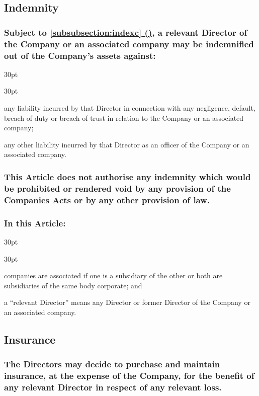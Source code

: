 \documentclass[12pt]{article}
\newcommand*{\fancyref}[1]{\hyperref[{#1}]{\autoref*{#1} (\nameref*{#1})}}
\def\clauseindent{30pt}
\newenvironment{subindentlist}{\raggedright\begin{adjustwidth}{\clauseindent}{}\begin{labeledlist}{\clauseindent}}{\end{labeledlist}\end{adjustwidth}}
\begin{document}
\subsection{Indemnity}
\subsubsection[Indemnification of Directors]{Subject to \fancyref{subsubsection:indexc}, a relevant Director of the Company or an associated company may be indemnified out of the Company's assets against:}
\begin{subindentlist}
    \item [(a)] any liability incurred by that Director in connection with any negligence, default, breach of duty or breach of trust in relation to the Company or an associated company;
    \item [(b)] any other liability incurred by that Director as an officer of the Company or an associated company.
\end{subindentlist}
\subsubsection[Exceptions to Indemnification of Directors]{This Article does not authorise any indemnity which would be prohibited or rendered void by any provision of the Companies Acts or by any other provision of law.} \label{subsubsection:indexc}
\subsubsection[Specifics of Indemnity]{In this Article:}
\begin{subindentlist}
    \item [(a)] companies are associated if one is a subsidiary of the other or both are subsidiaries of the same body corporate; and
    \item [(b)] a ``relevant Director'' means any Director or former Director of the Company or an associated company.
\end{subindentlist}

\subsection{Insurance}
\subsubsection[Purchase and Maintenance of Insurance]{The Directors may decide to purchase and maintain insurance, at the expense of the Company, for the benefit of any relevant Director in respect of any relevant loss.}
\end{document}
